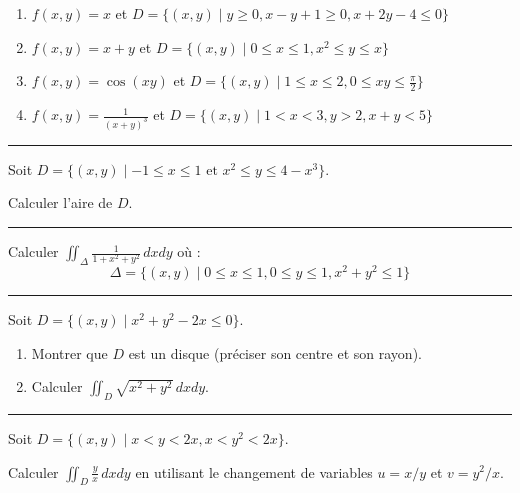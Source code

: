 \documentclass[../PolyS2.tex]{subfiles}
\begin{document}
\begin{enumerate}
\item $f(x,y) = x$ et $D = \{(x,y) \mid y \geq 0, x-y+1 \geq 0, x+2y-4 \leq 0\}$
\item $f(x,y) = x+y$ et $D = \{(x,y) \mid 0 \leq x \leq 1, x^2 \leq y \leq x\}$
\item $f(x,y) = \cos(xy)$ et $D = \{(x,y) \mid 1 \leq x \leq 2, 0 \leq xy \leq \frac{\pi}{2}\}$
\item $f(x,y) = \frac{1}{(x+y)^3}$ et $D = \{(x,y) \mid 1 < x < 3, y > 2, x+y < 5\}$
\end{enumerate}

\vspace{1em}\hrule\vspace{1em}


Soit $D = \{(x,y) \mid -1 \leq x \leq 1 \text{ et } x^2 \leq y \leq 4-x^3\}$.

Calculer l'aire de $D$.

\vspace{1em}\hrule\vspace{1em}


Calculer $\displaystyle\iint_\Delta \frac{1}{1+x^2+y^2} \, dxdy$ où :
$$\Delta = \{(x,y) \mid 0 \leq x \leq 1, 0 \leq y \leq 1, x^2+y^2 \leq 1\}$$

\vspace{1em}\hrule\vspace{1em}


Soit $D = \{(x,y) \mid x^2+y^2-2x \leq 0\}$.
\begin{enumerate}
\item Montrer que $D$ est un disque (préciser son centre et son rayon).
\item Calculer $\displaystyle\iint_D \sqrt{x^2+y^2} \, dxdy$.
\end{enumerate}

\vspace{1em}\hrule\vspace{1em}

\newpage 


Soit $D = \{(x,y) \mid x < y < 2x, x < y^2 < 2x\}$.

Calculer $\displaystyle\iint_D \frac{y}{x} \, dxdy$ en utilisant le changement de variables $u = x/y$ et $v = y^2/x$.
\end{document}
